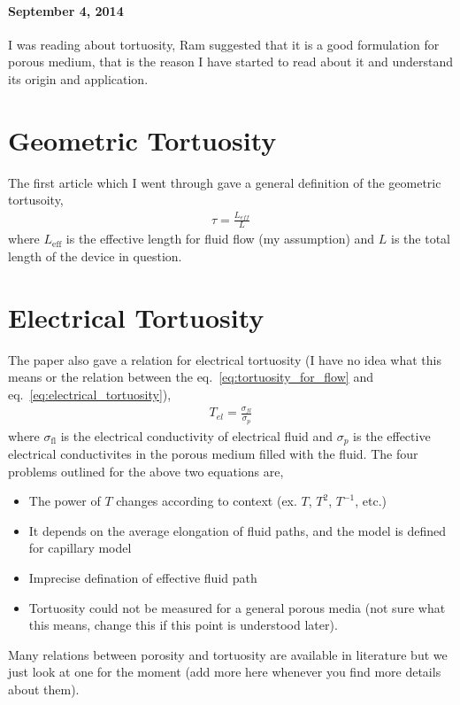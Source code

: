 \documentclass[12pt]{book}
\begin{document}
\paragraph{September 4, 2014}
I was reading about tortuosity, Ram suggested that it is a good formulation for porous medium, that is the reason I have started to read about it and understand its origin and application.
\section{Geometric Tortuosity} The first article which I went through gave a general definition of the geometric tortusoity,
\begin{align}
\tau = \frac{L_{eff}}{L}
\label{eq:tortuosity_for_flow}
\end{align}
where $L_{\textrm{eff}}$ is the effective length for fluid flow (my assumption) and $L$ is the total length of the device in question. 

\section{Electrical Tortuosity} The paper also gave a relation for electrical tortuosity (I have no idea what this means or the relation between the eq.~\ref{eq:tortuosity_for_flow} and eq.~\ref{eq:electrical_tortuosity}),
\begin{align}
T_{el}=\frac{\sigma_{fl}}{\sigma_p}
\label{eq:electrical_tortuosity}
\end{align}
where $\sigma_{\textrm{fl}}$ is the electrical conductivity of electrical fluid and $\sigma_p$ is the effective electrical conductivites in the porous medium filled with the fluid.
The four problems outlined for the above two equations are,
\begin{itemize}
    \item The power of $T$ changes according to context (ex. $T$, $T^2$, $T^{-1}$, etc.)
    \item It depends on the average elongation of fluid paths, and the model is defined for capillary model
    \item Imprecise defination of effective fluid path
    \item Tortuosity could not be measured for a general porous media (not sure what this means, change this if this point is understood later). 
\end{itemize}
Many relations between porosity and tortuosity are available in literature but we just look at one for the moment (add more here whenever you find more details about them).
\end{document}
